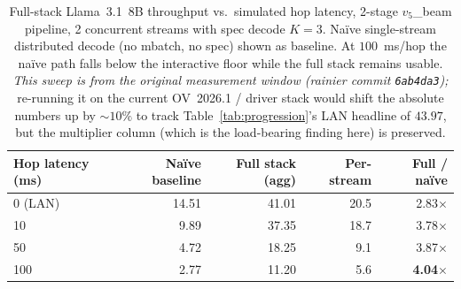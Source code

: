 \documentclass[11pt]{article}
\begin{document}
\begin{table}[ht]
\centering
\caption{Full-stack Llama~3.1~8B throughput vs.\ simulated hop latency, 2-stage $v_5$\_beam pipeline, 2 concurrent streams with spec decode $K\!=\!3$. Naïve single-stream distributed decode (no mbatch, no spec) shown as baseline. At $100$~ms/hop the naïve path falls below the interactive floor while the full stack remains usable. \emph{This sweep is from the original measurement window (rainier commit \texttt{6ab4da3});} re-running it on the current OV~2026.1 / driver stack would shift the absolute numbers up by ${\sim}10\%$ to track Table~\ref{tab:progression}'s LAN headline of $43.97$, but the multiplier column (which is the load-bearing finding here) is preserved.}
\label{tab:wan}
\begin{tabular}{@{}lrrrr@{}}
\toprule
Hop latency (ms) & Naïve baseline & Full stack (agg) & Per-stream & Full / naïve \\
\midrule
0 (LAN)  & 14.51 & 41.01 & 20.5 & 2.83$\times$ \\
10       &  9.89 & 37.35 & 18.7 & 3.78$\times$ \\
50       &  4.72 & 18.25 &  9.1 & 3.87$\times$ \\
100      &  2.77 & 11.20 &  5.6 & \textbf{4.04$\times$} \\
\bottomrule
\end{tabular}
\end{table}
\end{document}
